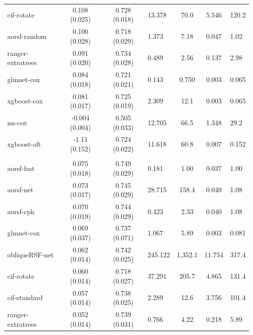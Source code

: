 \documentclass[twoside,11pt]{article}\usepackage[]{graphicx}\usepackage[]{xcolor}
\newenvironment{knitrout}{}{} %
\begin{document}
\begin{knitrout}
\begin{longtable}{lcclccl}
\hspace{1em}cif-rotate & 0.108 (0.025) & 0.728 (0.018) & 13.378 & 70.0 & 5.546 & 120.2\\
\hspace{1em}aorsf-random & 0.100 (0.028) & 0.718 (0.029) & 1.373 & 7.18 & 0.047 & 1.02\\
\hspace{1em}ranger-extratrees & 0.091 (0.020) & 0.734 (0.028) & 0.489 & 2.56 & 0.137 & 2.98\\
\hspace{1em}glmnet-cox & 0.084 (0.018) & 0.721 (0.021) & 0.143 & 0.750 & 0.003 & 0.065\\
\hspace{1em}xgboost-cox & 0.081 (0.017) & 0.725 (0.019) & 2.309 & 12.1 & 0.003 & 0.065\\
\hspace{1em}nn-cox & -0.004 (0.004) & 0.505 (0.033) & 12.705 & 66.5 & 1.348 & 29.2\\
\hspace{1em}xgboost-aft & -1.11 (0.152) & 0.724 (0.022) & 11.618 & 60.8 & 0.007 & 0.152\\
\addlinespace[0.3em]
\hline
\multicolumn{7}{l}{\textit{\textbf{GUIDE-IT; CVD death, n = 894, p = 59}}}\\
\hline
\hspace{1em}aorsf-fast & 0.075 (0.018) & 0.749 (0.029) & 0.181 & 1.00 & 0.037 & 1.00\\
\hspace{1em}aorsf-net & 0.073 (0.017) & 0.745 (0.029) & 28.715 & 158.4 & 0.040 & 1.08\\
\hspace{1em}aorsf-cph & 0.070 (0.019) & 0.744 (0.029) & 0.423 & 2.33 & 0.040 & 1.08\\
\hspace{1em}glmnet-cox & 0.069 (0.037) & 0.737 (0.071) & 1.067 & 5.89 & 0.003 & 0.081\\
\hspace{1em}obliqueRSF-net & 0.062 (0.014) & 0.742 (0.025) & 245.122 & 1,352.1 & 11.754 & 317.4\\
\hspace{1em}cif-rotate & 0.060 (0.014) & 0.718 (0.027) & 37.291 & 205.7 & 4.865 & 131.4\\
\hspace{1em}cif-standard & 0.057 (0.014) & 0.738 (0.025) & 2.289 & 12.6 & 3.756 & 101.4\\
\hspace{1em}ranger-extratrees & 0.052 (0.014) & 0.739 (0.031) & 0.766 & 4.22 & 0.218 & 5.89\\

\end{longtable}
\end{knitrout}
\end{document}
